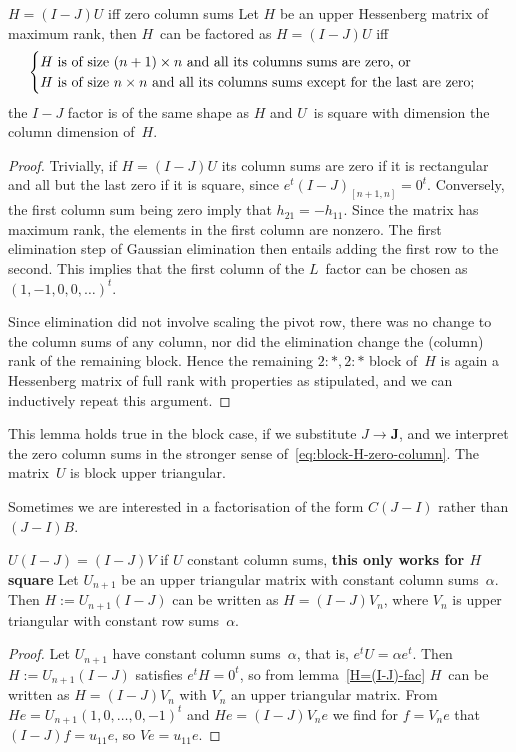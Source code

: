 \begin{llemma}{$H=(I-J)U$ iff zero column sums}
\label{H=(I-J)-fac}
Let $H$ be an upper Hessenberg matrix of maximum rank, then $H$~can be
factored as $H=(I-J)U$ iff 
\[ 
\begin{cases}
  \hbox{$H$ is of size $(n+1)\times n$ and all its columns sums are
    zero, or}\\
  \hbox{$H$ is of size $n\times n$ and all its columns sums except for
    the last are zero;}
\end{cases}
\]
the $I-J$ factor is of the same shape as $H$ and $U$~is square with
dimension the column dimension of~$H$.
\end{llemma}
\begin{proof}
  Trivially, if $H=(I-J)U$ its column sums are zero if it is
  rectangular and all but the last zero if it is square, since
  $e^t(I-J)_{[n+1,n]}=0^t$.  Conversely, the first column sum being
  zero imply that $h_{21}=-h_{11}$.  Since the matrix has maximum
  rank, the elements in the first column are nonzero.  The first
  elimination step of Gaussian elimination then entails adding the
  first row to the second.  This implies that the first column of the
  $L$~factor can be chosen as~$(1,-1,0,0,\ldots)^t$.

  Since elimination did not involve scaling the pivot row, there was
  no change to the column sums of any column, nor did the elimination
  change the (column) rank of the remaining block.  Hence the
  remaining $2:*,2:*$ block of~$H$ is again a Hessenberg matrix of
  full rank with properties as stipulated, and we can inductively
  repeat this argument.
\end{proof}

\begin{block}
This lemma holds true in the block case, if we substitute $J\rightarrow\bm{J}$,
and we interpret the zero column sums in the stronger sense
of~\eqref{eq:block-H-zero-column}. The matrix~$U$ is
block upper triangular.
\end{block}

Sometimes we are interested in a factorisation of the form $C(J-I)$
rather than $(J-I)B$.
\begin{llemma}{$U(I-J)=(I-J)V$ if $U$ constant column sums, {\bf this
      only works for $H$ square}}
\label{lemma:JI-right-fac}
Let $U_{n+1}$ be an upper triangular matrix with constant column
sums~$\alpha$. Then $H:=U_{n+1}(I-J)$ can be written as $H=(I-J)V_n$,
where $V_n$ is upper triangular with constant row sums~$\alpha$.
\end{llemma}
\begin{proof}
  Let $U_{n+1}$ have constant column sums~$\alpha$, that is,
  $e^tU=\alpha e^t$.  Then $H:=U_{n+1}(I-J)$ satisfies $e^tH=0^t$, so
  from lemma~\ref{H=(I-J)-fac} $H$~can be written as $H=(I-J)V_n$ with
  $V_n$ an upper triangular matrix.  From $He=U_{n+1}(1,0,\ldots,0,-1)^t$
  and $He=(I-J)V_ne$ we find for $f=V_ne$ that $(I-J)f=u_{11}e$, so
  $Ve=u_{11}e$.
\end{proof}

